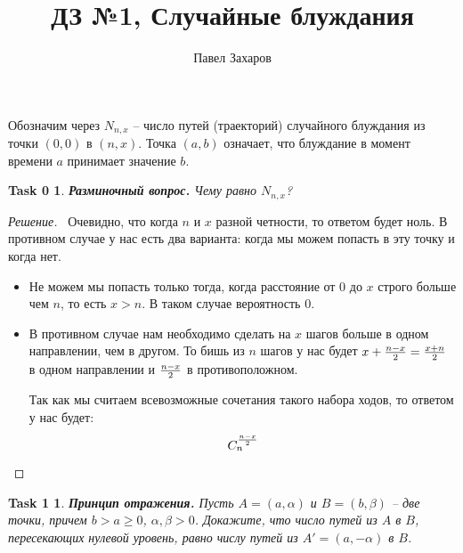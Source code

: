 \documentclass[12pt,a4paper]{extarticle}
\title{\Huge{ДЗ №1, Случайные блуждания}}
\author{Павел Захаров}
\date{}
\newtheorem*{task0}{Task 0}
\newtheorem*{task1}{Task 1}
\begin{document}
	\maketitle
	Обозначим через $N_{n, x}$ -- число путей (траекторий) случайного блуждания из точки $(0, 0)$ в $(n, x)$. Точка $(a, b)$ означает, что 
	блуждание в момент времени $a$ принимает значение $b$.	
	
	
	\vspace{\baselineskip}
	
	
	\begin{task0}
		\textbf{Разминочный вопрос.} Чему равно $N_{n,x}$?	
	\end{task0}
	
	\begin{proof}[Решение]
		\
			Очевидно, что когда $n$ и $x$ разной четности, то ответом будет ноль. В противном случае у нас есть два варианта: когда мы можем попасть в эту точку и когда нет.
			\begin{itemize}
				\item Не можем мы попасть только тогда, когда расстояние от 0 до $x$ строго больше чем $n$, то есть $x > n$. В таком случае вероятность 0.
				\item В противном случае нам необходимо сделать на $x$ шагов больше в одном направлении, чем в другом. То бишь из $n$ шагов у нас будет $x + {n-x\over 2} = {x+n\over 2}$ в одном направлении и ${n-x\over 2}$ в противоположном. 
				
				Так как мы считаем всевозможные сочетания такого набора ходов, то ответом у нас будет: \[C_n^{n-x\over 2}\]
			\end{itemize}
	\end{proof}
	
	
	
	\vspace{\baselineskip}
	\begin{task1}
		\textbf{Принцип отражения.} Пусть $A = (a, \alpha)$ и $B = (b, \beta)$ -- две точки, причем $b > a \geq 0$,
		$\alpha, \beta > 0$. Докажите, что число путей из $A$ в $B$, пересекающих нулевой уровень, равно числу путей из $A' = (a, -\alpha)$ в $B$.
	\end{task1}
	
\end{document}
